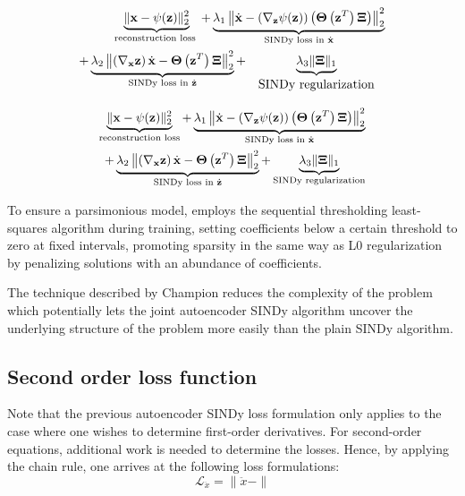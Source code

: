 \begin{align}
    \underbrace{\|\mathbf{x}-\psi(\mathbf{z})\|_2^2}_{\text {reconstruction loss }}
    +\underbrace{\lambda_1\left\|\dot{\mathbf{x}}-\left(\nabla_{\mathbf{z}} \psi(\mathbf{z})\right)\left(\boldsymbol{\Theta}\left(\mathbf{z}^T\right) \boldsymbol{\Xi}\right)\right\|_2^2}_{\text {SINDy loss in } \dot{\mathbf{x}}} \notag 
    \\
    +\underbrace{\lambda_2\left\|\left(\nabla_{\mathbf{x}} \mathbf{z}\right) \dot{\mathbf{x}}-\boldsymbol{\Theta}\left(\mathbf{z}^T\right) \boldsymbol{\Xi}\right\|_2^2}_{\text {SINDy loss in } \dot{\mathbf{z}}}+\underbrace{\lambda_3\|\boldsymbol{\Xi}\|_1}_{\begin{array}{c}\text { SINDy regularization }\end{array}}
\end{align}

\begin{align}
    \underbrace{\|\mathbf{x}-\psi(\mathbf{z})\|_2^2}_{\text{reconstruction loss}}
    + \underbrace{\lambda_1\left\|\dot{\mathbf{x}}-\left(\nabla_{\mathbf{z}} \psi(\mathbf{z})\right)\left(\boldsymbol{\Theta}\left(\mathbf{z}^T\right) \boldsymbol{\Xi}\right)\right\|_2^2}_{\text{SINDy loss in } \dot{\mathbf{x}}} \notag 
    \\
    + \underbrace{\lambda_2\left\|\left(\nabla_{\mathbf{x}} \mathbf{z}\right) \dot{\mathbf{x}}-\boldsymbol{\Theta}\left(\mathbf{z}^T\right) \boldsymbol{\Xi}\right\|_2^2}_{\text{SINDy loss in } \dot{\mathbf{z}}}
    + \underbrace{\lambda_3\|\boldsymbol{\Xi}\|_1}_{\text{SINDy regularization}}
\end{align}



To ensure a parsimonious model, \textcite{Champion_2019} employs the sequential thresholding least-squares algorithm during training, setting coefficients below a certain threshold to zero at fixed intervals, promoting sparsity in the same way as L0 regularization by penalizing solutions with an abundance of coefficients. 

The technique described by Champion reduces the complexity of the problem which potentially lets the joint autoencoder SINDy algorithm uncover the underlying structure of the problem more easily than the plain SINDy algorithm.
\subsection{Second order loss function}
Note that the previous autoencoder SINDy loss formulation only applies to the case where one wishes to determine first-order derivatives. 
For second-order equations, additional work is needed to determine the losses. 
Hence, by applying the chain rule, one arrives at the following loss formulations:
\begin{equation*}
    \mathcal L_{\ddot{x}} = \|\ddot{x} - \|
\end{equation*}
 
